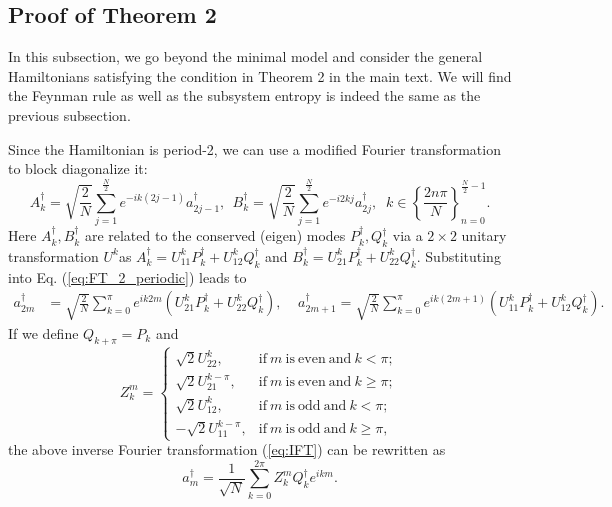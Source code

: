 \documentclass[aps,onecolumn,nofootinbib,superscriptaddress,notitlepage,longbibliography]{revtex4-1}
\begin{document}
\subsection{Proof of %
Theorem 2 \label{subsec:Proof-of-main}}

In this subsection, we go %
beyond the minimal model and consider the general Hamiltonians satisfying the condition in %
Theorem 2 in the main text. We will find the Feynman rule as well as the subsystem entropy
is indeed the same as the previous subsection.

Since the Hamiltonian is period-2, we can use a modified Fourier
transformation to block diagonalize it:
\begin{equation}
A_{k}^{\dagger}=\sqrt{\frac{2}{N}}\sum_{j=1}^{\frac{N}{2}}e^{-ik(2j-1)}a_{2j-1}^{\dagger},\ \ B_k^\dag=\sqrt{\frac{2}{N}}\sum_{j=1}^{\frac{N}{2}}e^{-i2kj}a_{2j}^{\dagger},\;\;%
k\in\left\{\frac{2n\pi}{N}\right\}^{\frac{N}{2}-1}_{n=0}.
\label{eq:FT_2_periodic}
\end{equation}
Here $A_{k}^{\dagger},B_{k}^{\dagger}$ are related to the conserved (eigen) modes
$P_{k}^{\dagger},Q_{k}^{\dagger}$ via a $2\times2$ unitary transformation
$U^{k}$as $A_{k}^{\dagger}=U_{11}^{k}P_{k}^{\dagger}+U_{12}^{k}Q_{k}^{\dagger}$
and $B_{k}^{\dagger}=U_{21}^{k}P_{k}^{\dagger}+U_{22}^{k}Q_{k}^{\dagger}$.
Substituting into Eq. (\ref{eq:FT_2_periodic}) leads to 
\begin{align}
a_{2m}^{\dagger} & =\sqrt{\frac{2}{N}}\sum_{k=0}^{\pi}e^{ik2m}(U_{21}^{k}P_{k}^{\dagger}+U_{22}^{k}Q_{k}^{\dagger}),\;\;\;\;
a_{2m+1}^{\dagger}  =\sqrt{\frac{2}{N}}\sum_{k=0}^{\pi}e^{ik(2m+1)}(U_{11}^{k}P_{k}^{\dagger}+U_{12}^{k}Q_{k}^{\dagger}).
\label{eq:IFT}
\end{align}
If we define $Q_{k+\pi}=P_{k}$ %
and 
\begin{equation}
Z_{k}^{m}=\begin{cases}
\sqrt{2}U_{22}^{k}, & \mathrm{if\ }m\ \mathrm{is\ even\ and}\ k<\pi;\\
\sqrt{2}U_{21}^{k-\pi}, & \mathrm{if\ }m\ \mathrm{is\ even\ and}\ k\geq\pi;\\
\sqrt{2}U_{12}^{k}, & \mathrm{if\ }m\ \mathrm{is\ odd\ and}\ k<\pi;\\
-\sqrt{2}U_{11}^{k-\pi}, & \mathrm{if\ }m\ \mathrm{is\ odd\ and}\ k\geq\pi,
\end{cases}
\label{eq:Zkm}
\end{equation}
the above inverse Fourier transformation (\ref{eq:IFT}) can be rewritten as
\[
a_{m}^{\dagger}=\frac{1}{\sqrt{N}}\sum_{k=0}^{2\pi}Z_{k}^{m}Q_{k}^{\dagger}e^{ikm}.
\]
\end{document}
